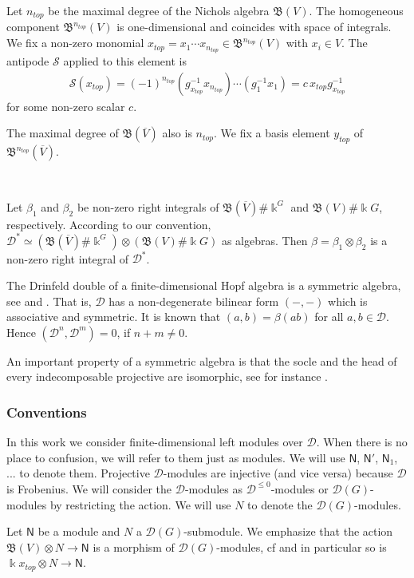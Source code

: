 \documentclass[reqno]{amsart}
\newcommand{\cS}{\mathcal{S}}
\newcommand{\xtop}{x_{top}}
\newcommand{\ytop}{y_{top}}
\newcommand{\oV}{\overline{V}}
\renewcommand{\_}[1]{_{\left( #1 \right)}}
\renewcommand{\^}[1]{^{\left( #1 \right)}}
\newcommand{\ot}{{\otimes}}
\newcommand{\ku}{\Bbbk}
\newcommand\fN{\mathsf{N}}
\newcommand{\D}{\mathcal{D}}
\newcommand{\BV}{{\mathfrak B}}
\theoremstyle{plain}
\theoremstyle{definition}
\theoremstyle{remark}
\begin{document}
Let $n_{top}$ be the maximal degree of the Nichols algebra $\BV(V)$. The homogeneous component $\BV^{n_{top}}(V)$ is one-dimensional and coincides with space of integrals. We fix a non-zero monomial 
$\xtop=x_1\cdots x_{n_{top}}\in\BV^{n_{top}}(V)$ with $x_i\in V$. The antipode $\cS$ applied to this element is
\begin{align}\label{eq:S en xtop}
\cS(\xtop)=(-1)^{n_{top}}(g_{\xtop}^{-1}x_{n_{top}})\cdots(g_1^{-1}x_1)=c\,\xtop g_{\xtop}^{-1}
\end{align}
for some non-zero scalar $c$.

The maximal degree of $\BV(\oV)$ also is $n_{top}$. We fix a basis element $\ytop$ of $\BV^{n_{top}}(\oV)$.

\


Let $\beta_1$ and $\beta_2$ be non-zero right integrals of $\BV(\oV)\#\ku^G$ and $\BV(V)\#\ku G$, respectively. According to our convention, $\D^*\simeq(\BV(\oV)\#\ku^G)\ot(\BV(V)\#\ku G)$ as algebras. Then $\beta=\beta_1\ot\beta_2$ is a non-zero right integral of $\D^*$.  

The Drinfeld double of a finite-dimensional Hopf algebra is a symmetric algebra, see \cite[p. 488, (3)]{MR1435369} and \cite{MR0347838,MR1220770}. That is, $\D$ has a non-degenerate bilinear form $(-,-)$ which is associative and symmetric. It is known that $(a,b)=\beta(ab)$ for all $a,b\in\D$. Hence $(\D^n,\D^m)=0$, if $n+m\neq0$.


An important property of a symmetric algebra is that the socle and the head of every indecomposable projective are isomorphic, see for instance \cite[(9.12)]{MR1038525}.



\subsubsection*{Conventions} In this work we consider finite-dimensional left modules over $\D$. When there is no place to confusion, we will refer to them just as modules. We will use $\fN$, $\fN'$, $\fN_1$, ... to denote them. Projective $\D$-modules are injective (and vice versa) because $\D$ is Frobenius.
We will consider the $\D$-modules as $\D^{\leq0}$-modules or $\D(G)$-modules by restricting the action. We will use $N$ to denote the $\D(G)$-modules. 

Let $\fN$ be a module and $N$ a $\D(G)$-submodule. We emphasize that the action $\BV(V)\ot N\longrightarrow\fN$ is a morphism of $\D(G)$-modules, cf \cite[(31)]{PV2} and in particular so is $\ku\xtop\ot N\longrightarrow\fN$.
\end{document}

